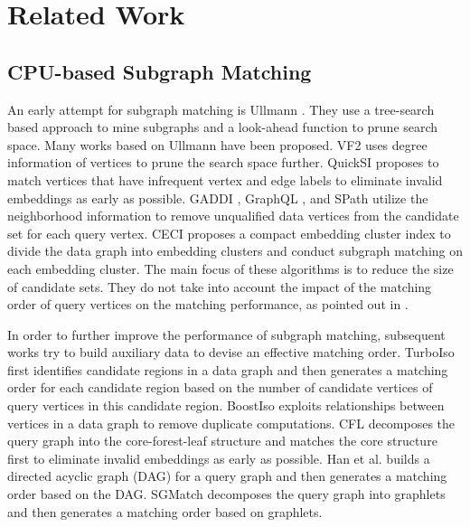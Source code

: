 \section{Related Work}
\subsection{CPU-based Subgraph Matching}
An early attempt for subgraph matching is Ullmann \cite{ullmann1976algorithm}. They use a tree-search based approach to mine subgraphs and a look-ahead function to prune search space. Many works \cite{cordella2001improved, shang2008taming,zhang2009gaddi,he2008graphs,zhao2010graph} based on Ullmann have been proposed. VF2 \cite{cordella2001improved} uses degree information of vertices to prune the search space further. QuickSI \cite{shang2008taming} proposes to match vertices that have infrequent vertex and edge labels to eliminate invalid embeddings as early as possible. GADDI \cite{zhang2009gaddi}, GraphQL \cite{he2008graphs}, and SPath \cite{zhao2010graph} utilize the neighborhood information to remove unqualified data vertices from the candidate set for each query vertex. CECI \cite{bhattarai2019ceci} proposes a compact embedding cluster index to divide the data graph into embedding clusters and conduct subgraph matching on each embedding cluster. The main focus of these algorithms is to reduce the size of candidate sets. They do not take into account the impact of the matching order of query vertices on the matching performance, as pointed out in \cite{lee2012depth}.

In order to further improve the performance of subgraph matching, subsequent works \cite{han2013turboiso,ren2015exploiting,bi2016efficient,han2019efficient,rivero2017efficient} try to build auxiliary data to devise an effective matching order. TurboIso \cite{han2013turboiso} first identifies candidate regions in a data graph and then generates a matching order for each candidate region based on the number of candidate vertices of query vertices in this candidate region. BoostIso \cite{ren2015exploiting} exploits relationships between vertices in a data graph to remove duplicate computations. CFL \cite{bi2016efficient} decomposes the query graph into the core-forest-leaf structure and matches the core structure first to eliminate invalid embeddings as early as possible. Han et al. \cite{han2019efficient} builds a directed acyclic graph (DAG) for a query graph and then generates a matching order based on the DAG. SGMatch \cite{rivero2017efficient} decomposes the query graph into graphlets and then generates a matching order based on graphlets.

